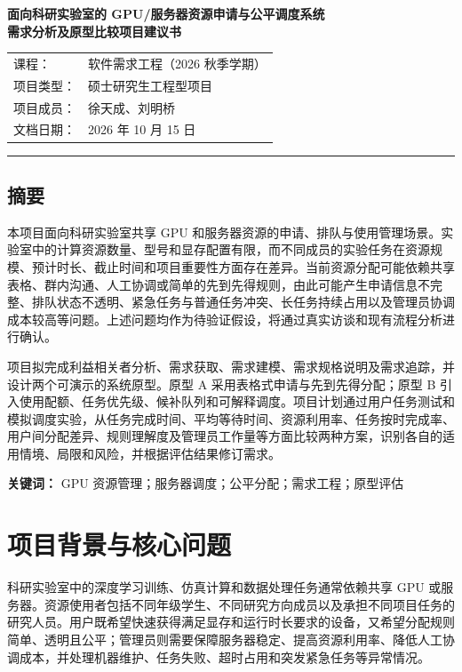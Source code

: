 \documentclass[UTF8,10.5pt,a4paper,fontset=mac]{ctexart}
\begin{document}
\begin{center}
  {\sffamily\bfseries{}\color{accent} 面向科研实验室的 GPU/服务器资源申请与公平调度系统}\\[0.35em]
  {\sffamily\bfseries{}需求分析及原型比较项目建议书}\\[0.75em]
  \begin{tabular}{@{}ll@{}}
    课程： & 软件需求工程（2026 秋季学期） \\
    项目类型： & 硕士研究生工程型项目 \\
    项目成员： & 徐天成、刘明桥 \\
    文档日期： & 2026 年 10 月 15 日
  \end{tabular}
\end{center}

\vspace{0.35em}
\noindent\textcolor{accent}{\rule{\linewidth}{1.1pt}}

\subsection*{摘要}

本项目面向科研实验室共享 GPU 和服务器资源的申请、排队与使用管理场景。实验室中的计算资源数量、型号和显存配置有限，而不同成员的实验任务在资源规模、预计时长、截止时间和项目重要性方面存在差异。当前资源分配可能依赖共享表格、群内沟通、人工协调或简单的先到先得规则，由此可能产生申请信息不完整、排队状态不透明、紧急任务与普通任务冲突、长任务持续占用以及管理员协调成本较高等问题。上述问题均作为待验证假设，将通过真实访谈和现有流程分析进行确认。

项目拟完成利益相关者分析、需求获取、需求建模、需求规格说明及需求追踪，并设计两个可演示的系统原型。原型 A 采用表格式申请与先到先得分配；原型 B 引入使用配额、任务优先级、候补队列和可解释调度。项目计划通过用户任务测试和模拟调度实验，从任务完成时间、平均等待时间、资源利用率、任务按时完成率、用户间分配差异、规则理解度及管理员工作量等方面比较两种方案，识别各自的适用情境、局限和风险，并根据评估结果修订需求。

\noindent\textbf{关键词：} GPU 资源管理；服务器调度；公平分配；需求工程；原型评估

\section{项目背景与核心问题}

科研实验室中的深度学习训练、仿真计算和数据处理任务通常依赖共享 GPU 或服务器。资源使用者包括不同年级学生、不同研究方向成员以及承担不同项目任务的研究人员。用户既希望快速获得满足显存和运行时长要求的设备，又希望分配规则简单、透明且公平；管理员则需要保障服务器稳定、提高资源利用率、降低人工协调成本，并处理机器维护、任务失败、超时占用和突发紧急任务等异常情况。
\end{document}
